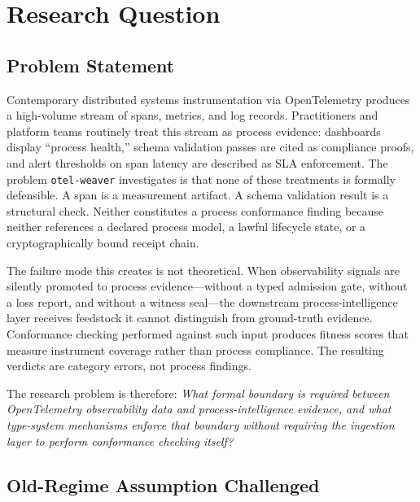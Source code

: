 
\section{Research Question}
\label{sec:otel-weaver-rq}

\subsection{Problem Statement}
\label{sec:otel-weaver-rq-problem}

Contemporary distributed systems instrumentation via OpenTelemetry produces a high-volume stream of
spans, metrics, and log records. Practitioners and platform teams routinely treat this stream as
process evidence: dashboards display ``process health,'' schema validation passes are cited as
compliance proofs, and alert thresholds on span latency are described as SLA enforcement. The
problem \texttt{otel-weaver} investigates is that none of these treatments is formally defensible.
A span is a measurement artifact. A schema validation result is a structural check. Neither
constitutes a process conformance finding because neither references a declared process model, a
lawful lifecycle state, or a cryptographically bound receipt chain.

The failure mode this creates is not theoretical. When observability signals are silently promoted
to process evidence---without a typed admission gate, without a loss report, and without a witness
seal---the downstream process-intelligence layer receives feedstock it cannot distinguish from
ground-truth evidence. Conformance checking performed against such input produces fitness scores
that measure instrument coverage rather than process compliance. The resulting verdicts are
category errors, not process findings.

The research problem is therefore: \emph{What formal boundary is required between OpenTelemetry
observability data and process-intelligence evidence, and what type-system mechanisms enforce that
boundary without requiring the ingestion layer to perform conformance checking itself?}

\subsection{Old-Regime Assumption Challenged}
\label{sec:otel-weaver-rq-old-regime}

